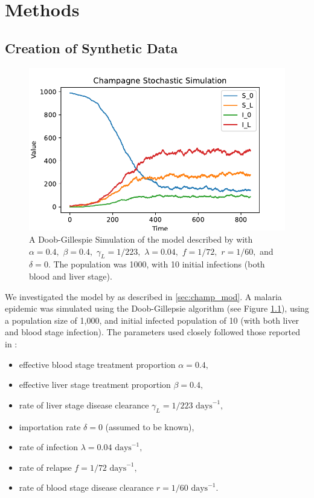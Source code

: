 \chapter{Methods}

\section{Creation of Synthetic Data}

\begin{figure}[htbp]
    \centering
    \includegraphics{../champagne_GP_images/champagne_simulation.pdf}
    \caption{
        A Doob-Gillespie Simulation of the model described by
        \cite{champagne_using_2022} with $\alpha = 0.4,$ $\beta = 0.4,$
        $\gamma_L = 1 / 223,$ $\lambda = 0.04,$ $f = 1 / 72,$ $r = 1 / 60,$ and
        $\delta = 0.$ The population was 1000, with 10 initial infections
        (both blood and liver stage).
    }
    \label{fig:champ_doob}
\end{figure}

We investigated the model by \cite{champagne_using_2022} as described in
\ref{sec:champ_mod}. A malaria epidemic was simulated using the Doob-Gillepsie
algorithm (see Figure \ref{fig:champ_doob}), using a population
size of 1,000, and initial infected population of 10 (with both liver and blood
stage infection). The parameters used closely followed those reported in
\cite{champagne_using_2022}: \begin{itemize}
    \item effective blood stage treatment proportion $\alpha = 0.4,$
    \item effective liver stage treatment proportion $\beta = 0.4,$
    \item rate of liver stage disease clearance
          $\gamma_L = 1 / 223 \text{ days}^{-1},$
    \item importation rate $\delta = 0$ (assumed to be known),
    \item rate of infection $\lambda = 0.04 \text{ days}^{-1},$
    \item rate of relapse $f = 1 / 72 \text{ days}^{-1},$
    \item rate of blood stage disease clearance $r = 1 / 60 \text{ days}^{-1}.$
\end{itemize}

